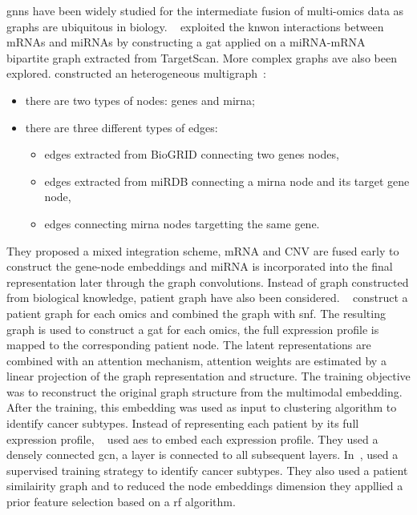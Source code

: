 \documentclass[../main.tex]{subfiles}
\begin{document}
	    \Glspl{gnn} have been widely studied for the intermediate fusion of multi-omics data as graphs are ubiquitous in biology.
	    \citeauthor{Kaczmarek2021}~\cite{Kaczmarek2021} exploited the knwon interactions between mRNAs and miRNAs by constructing a \gls{gat} applied on a miRNA-mRNA bipartite graph extracted from TargetScan.
	    More complex graphs ave also been explored.
	    \citeauthor{Li2024} constructed an heterogeneous multigraph~\cite{Li2024}:
	    \begin{itemize}[nosep]
	        \item there are two types of nodes: genes and \gls{mirna};
	        \item there are three different types of edges:
		        \begin{itemize}[nosep]
		            \item edges extracted from BioGRID\cite{biogrid} connecting two genes nodes,
		            \item edges extracted from miRDB\cite{mirdb} connecting a \gls{mirna} node and its target gene node,
		            \item edges connecting \gls{mirna} nodes targetting the same gene.
		        \end{itemize}
	    \end{itemize}
	    They proposed a mixed integration scheme, mRNA and CNV are fused early to construct the gene-node embeddings and miRNA is incorporated into the final representation later through the graph convolutions.
	    Instead of graph constructed from biological knowledge, patient graph have also been considered.
	    \citeauthor{MultiGATAE}~\cite{MultiGATAE} construct a patient graph for each omics and combined the graph with \gls{snf}.
	    The resulting graph is used to construct a \gls{gat} for each omics, the full expression profile is mapped to the corresponding patient node.
	    The latent representations are combined with an attention mechanism, attention weights are estimated by a linear projection of the graph representation and structure.
	    The training objective was to reconstruct the original graph structure from the multimodal embedding.
	    After the training, this embedding was used as input to clustering algorithm to identify cancer subtypes.
	    Instead of representing each patient by its full expression profile, \citeauthor{Zhang2022}~\cite{Zhang2022} used \glspl{ae} to embed each expression profile.
	    They used a densely connected \gls{gcn}, a layer is connected to all subsequent layers.
	    In~\cite{Kesimoglu2022}, \citeauthor{Kesimoglu2022} used a supervised training strategy to identify cancer subtypes.
	    They also used a patient similairity graph and to reduced the node embeddings dimension they appllied a prior feature selection based on a \gls{rf} algorithm.
\end{document}

